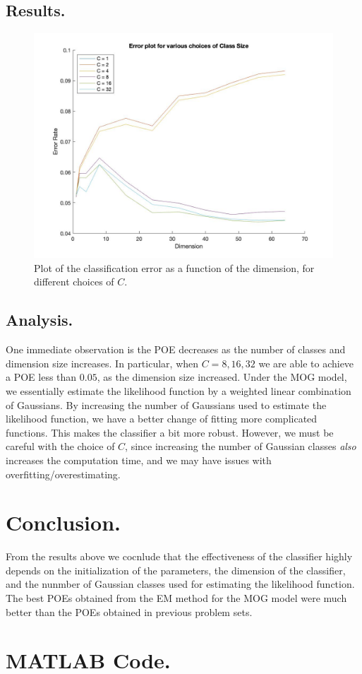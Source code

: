 \documentclass[10pt]{article}
\begin{document}
\subsection{Results.}
\begin{figure}[H]
	\centering 
	\includegraphics[scale=0.3]{part2_errorplot.jpg}
	\caption{Plot of the classification error as a function of the dimension, for different choices of $C$.}
\end{figure}
\subsection{Analysis.}
One immediate observation is the POE decreases as the number of classes and dimension size increases. In particular, when $C = 8,16,32$ we are able to achieve a POE less than $0.05$, as the dimension size increased. Under the MOG model, we essentially estimate the likelihood function by a weighted linear combination of Gaussians. By increasing the number of Gaussians used to estimate the likelihood function, we have a better change of fitting more complicated functions. This makes the classifier a bit more robust. However, we must be careful with the choice of $C$, since increasing the number of Gaussian classes \textit{also} increases the computation time, and we may have issues with overfitting/overestimating. 
\section{Conclusion.}
From the results above we cocnlude that the effectiveness of the classifier highly depends on the initialization of the parameters, the dimension of the classifier, and the nunmber of Gaussian classes used for estimating the likelihood function. The best POEs obtained from the EM method for the MOG model were much better than the POEs obtained in previous problem sets.
\section{MATLAB Code.} 






\end{document}
